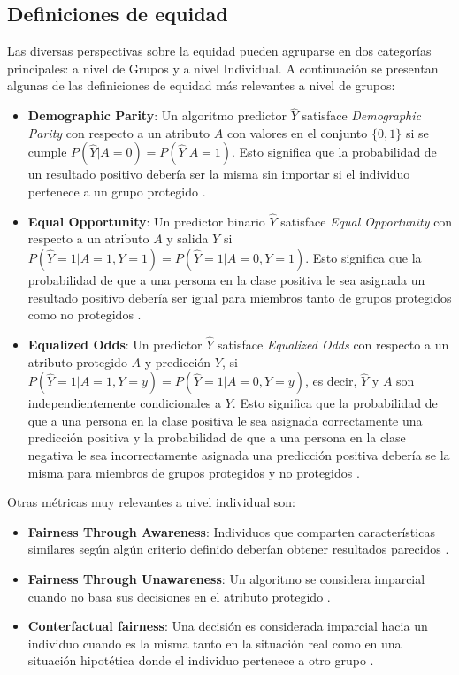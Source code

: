 \subsection{Definiciones de equidad}
Las diversas perspectivas sobre la equidad pueden agruparse en dos categor\'ias principales: a nivel de Grupos y a nivel Individual. 
A continuaci\'on se presentan algunas de las definiciones de equidad m\'as relevantes a nivel de grupos:

\begin{itemize}
    \item \textbf{Demographic Parity}: Un algoritmo predictor $\hat{Y}$ satisface \textit{Demographic Parity}
    con respecto a un atributo $A$ con valores en el conjunto $\{0,1\}$ si se cumple $P(\hat{Y} | A = 0) = P(\hat{Y} | A = 1)$. 
    Esto significa que la probabilidad de un resultado positivo debería ser la misma sin importar si el individuo pertenece a
    un grupo protegido \cite{fairness_def}.

    \item \textbf{Equal Opportunity}: Un predictor binario $\hat{Y}$ satisface \textit{Equal Opportunity} con 
    respecto a un atributo $A$ y salida $Y$ si $P(\hat{Y} = 1 | A = 1, Y = 1) = P(\hat{Y} = 1 | A = 0, Y = 1)$. Esto significa
    que la probabilidad de que a una persona en la clase positiva le sea asignada un resultado positivo 
    deber\'ia ser igual para miembros tanto de grupos protegidos como no protegidos \cite{fairness_def}.

    \item \textbf{Equalized Odds}: Un predictor $\hat{Y}$ satisface \textit{Equalized Odds} con respecto a un atributo
    protegido $A$ y predicci\'on $Y$, si $P(\hat{Y} = 1 | A = 1, Y = y) = P(\hat{Y} = 1 | A = 0, Y = y)$, es decir,
    $\hat{Y}$ y $A$ son independientemente condicionales a $Y$. Esto significa que la probabilidad de que a una persona 
    en la clase positiva le sea asignada correctamente una predicci\'on positiva y la probabilidad de que a una persona en la 
    clase negativa le sea incorrectamente asignada una predicci\'on positiva deber\'ia se la misma para miembros de grupos 
    protegidos y no protegidos \cite{fairness_def}.
\end{itemize}

Otras m\'etricas muy relevantes a nivel individual son:

\begin{itemize}
    \item \textbf{Fairness Through Awareness}: Individuos que comparten caracter\'isticas similares seg\'un alg\'un criterio 
    definido deber\'ian obtener resultados parecidos \cite{fair_awareness}.
    \item \textbf{Fairness Through Unawareness}: Un algoritmo se considera imparcial cuando no basa sus decisiones en el 
    atributo protegido \cite{counterfactual}.
    \item \textbf{Conterfactual fairness}: Una decisi\'on es considerada imparcial hacia un individuo cuando es la misma
    tanto en la situaci\'on real como en una situaci\'on hipot\'etica donde el individuo pertenece a otro grupo \cite{counterfactual}.
\end{itemize}

